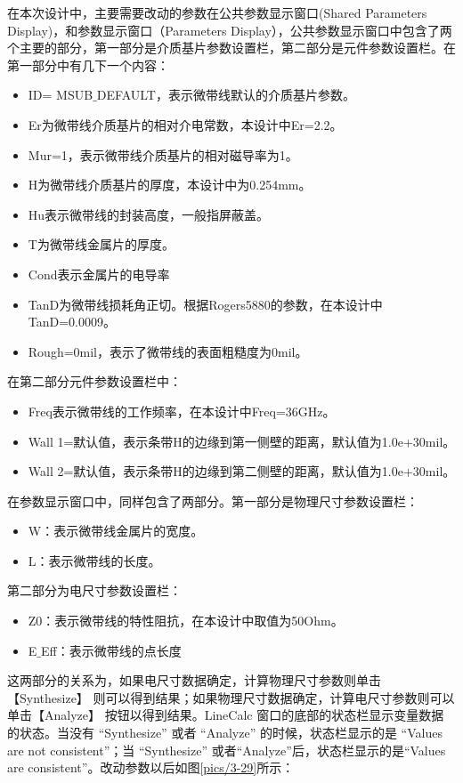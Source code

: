 在本次设计中，主要需要改动的参数在公共参数显示窗口(Shared Parameters Display)，和参数显示窗口（Parameters Display），公共参数显示窗口中包含了两个主要的部分，第一部分是介质基片参数设置栏，第二部分是元件参数设置栏。在第一部分中有几下一个内容：
\begin{itemize}
	\item ID= MSUB$\_$DEFAULT，表示微带线默认的介质基片参数。
	\item Er为微带线介质基片的相对介电常数，本设计中Er=2.2。
	\item Mur=1，表示微带线介质基片的相对磁导率为1。
	\item H为微带线介质基片的厚度，本设计中为0.254mm。
	\item Hu表示微带线的封装高度，一般指屏蔽盖。
	\item T为微带线金属片的厚度。
	\item Cond表示金属片的电导率
	\item TanD为微带线损耗角正切。根据Rogers5880的参数，在本设计中 TanD=0.0009。
	\item Rough=0mil，表示了微带线的表面粗糙度为0mil。

\end{itemize}
在第二部分元件参数设置栏中：
\begin{itemize}
	\item Freq表示微带线的工作频率，在本设计中Freq=36GHz。
	\item Wall 1=默认值，表示条带H的边缘到第一侧壁的距离，默认值为1.0e+30mil。
	\item Wall 2=默认值，表示条带H的边缘到第二侧壁的距离，默认值为1.0e+30mil。
\end{itemize}
在参数显示窗口中，同样包含了两部分。第一部分是物理尺寸参数设置栏：
\begin{itemize}
	\item W：表示微带线金属片的宽度。
	\item L：表示微带线的长度。
\end{itemize}
第二部分为电尺寸参数设置栏：
\begin{itemize}
	\item Z0：表示微带线的特性阻抗，在本设计中取值为50Ohm。
	\item E$\_$Eff：表示微带线的点长度
\end{itemize}

这两部分的关系为，如果电尺寸数据确定，计算物理尺寸参数则单击\linebreak[4] 【Synthesize】 则可以得到结果；如果物理尺寸数据确定，计算电尺寸参数则可以单击\linebreak[1] 【Analyze】 按钮以得到结果。LineCalc 窗口的底部的状态栏显示变量数据的状态。当没有 “Synthesize” 或者 “Analyze” 的时候，状态栏显示的是 “Values are not consistent”；当 “Synthesize” 或者“Analyze”后，状态栏显示的是“Values are consistent”。改动参数以后如图\ref{pics/3-29}所示：

